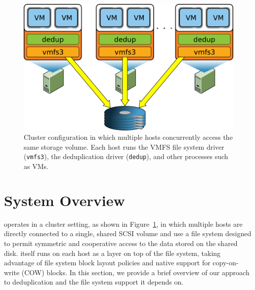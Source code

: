 

\begin{figure}
\centerline {
\includegraphics[scale=0.45]{figures/vmfs.pdf}
}
\caption{Cluster configuration in which multiple hosts
  concurrently access the same storage volume.  Each host runs the
  VMFS file system driver ({\tt \small vmfs3}), the deduplication
  driver ({\tt \small dedup}), and other
  processes such as VMs.}
\label{fig:vmfs-sysmodel}
\end{figure}


\section{System Overview}
\label{sec:overview}
\label{sec:idea:out-of-band}

\DeDe operates in a cluster setting, as shown in
Figure~\ref{fig:vmfs-sysmodel}, in which multiple hosts are directly
connected to a single, shared SCSI volume and use a file system designed
to permit symmetric and cooperative access to the data stored on the
shared disk.  \DeDe itself runs on each host as a layer on top of the
file system, taking advantage of file system block layout policies and
native support for copy-on-write (COW) blocks.  In this section, we
provide a brief overview of our approach to deduplication and the file
system support it depends on.


